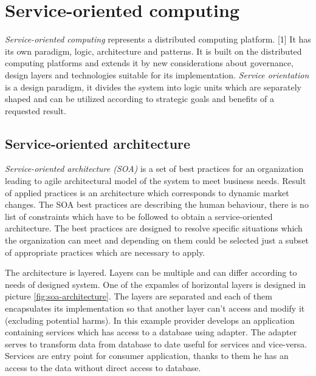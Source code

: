 \chapter{Service-oriented computing}
\label{chap:service-oriented computing}
\emph{Service-oriented computing} represents a distributed computing platform. [1] It has its own paradigm, logic, architecture and patterns. It is built on the distributed computing platforms and extends it by new considerations about governance, design layers and technologies suitable for its implementation.
\emph{Service orientation} is a design paradigm, it divides the system into logic units which are separately shaped and can be utilized according to strategic goals and benefits of a requested result.

\section{Service-oriented architecture}
\emph{Service-oriented architecture (SOA)} is a set of best practices for an organization leading to agile architectural model of the system to meet business needs. Result of applied practices is an architecture which corresponds to dynamic market changes. The SOA best practices are describing the human behaviour, there is no list of constraints which have to be followed to obtain a service-oriented architecture. The best practices are designed to resolve specific situations which the organization can meet and depending on them could be selected just a subset of appropriate practices which are necessary to apply.

The architecture is layered. Layers can be multiple and can differ according to needs of designed system. One of the expamles of horizontal layers is designed in picture \ref{fig:soa-architecture}. The layers are separated and each of them encapsulates its implementation so that another layer can't access and modify it (excluding potential harms). In this example provider develops an application containing services which has access to a database using adapter. The \gls{adapter} serves to transform data from database to date useful for services and vice-versa. Services are entry point for consumer application, thanks to them he has an access to the data without direct access to database.

